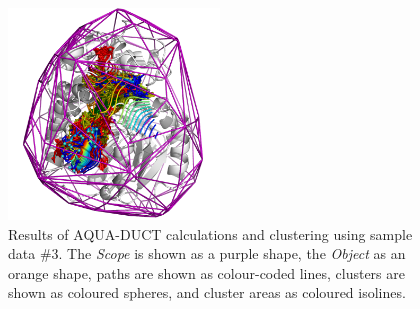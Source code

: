\documentclass[9pt,tutorial]{livecoms}
\begin{document}
\begin{figure}[ht!]
\centering
\includegraphics[width=0.5\textwidth]{Tut6.1.png}
\caption{Results of AQUA-DUCT calculations and clustering using sample data \#3. The \textit{Scope} is shown as a purple shape, the \textit{Object} as an orange shape, paths are shown as colour-coded lines, clusters are shown as coloured spheres, and cluster areas as coloured isolines.}
\label{Tut6.1}
\end{figure}
\end{document}
